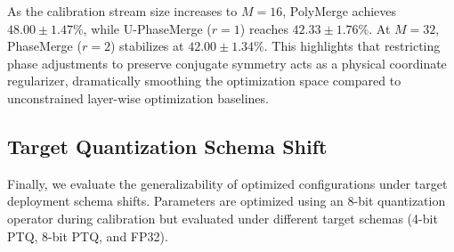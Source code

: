 As the calibration stream size increases to $M=16$, PolyMerge achieves $48.00 \pm 1.47\%$, while U-PhaseMerge ($r=1$) reaches $42.33 \pm 1.76\%$. At $M=32$, PhaseMerge ($r=2$) stabilizes at $42.00 \pm 1.34\%$. This highlights that restricting phase adjustments to preserve conjugate symmetry acts as a physical coordinate regularizer, dramatically smoothing the optimization space compared to unconstrained layer-wise optimization baselines.

\subsection{Target Quantization Schema Shift}

Finally, we evaluate the generalizability of optimized configurations under target deployment schema shifts. Parameters are optimized using an 8-bit quantization operator during calibration but evaluated under different target schemas (4-bit PTQ, 8-bit PTQ, and FP32).

\begin{table}[ht]
\caption{Target Schema Shift: Multi-Task average accuracy (\%) across different deployment schemas after calibrating under an 8-bit schema.}
\label{tab:schema_shift}
\vskip 0.15in
\begin{center}
\begin{small}
\begin{sc}
\end{sc}
\end{small}
\end{center}
\vskip -0.1in
\end{table}

